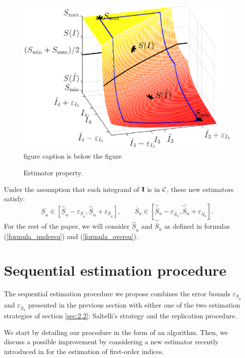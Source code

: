 \begin{figure}
\centering
\includegraphics[width=1\textwidth]{Images/estimator_3d_small.eps}
 figure caption is below the figure
\caption{Estimator property.}
\label{fig:1}       %
\end{figure} 

Under the assumption that each integrand of $\boldsymbol{\mathbf{I}}$ is in $\mathcal{C}$, these new estimators satisfy: \[ \underline{S}_u\in \left[ \widehat{\underline{S}}_u - \varepsilon_{\underline{S}_u}, \widehat{\underline{S}}_u + \varepsilon_{\underline{S}_u} \right], \qquad \overline{S}_u\in \left[ \widehat{\overline{S}}_u - \varepsilon_{\overline{S}_u}, \widehat{\overline{S}}_u + \varepsilon_{\overline{S}_u} \right] .\]
For the rest of the paper, we will consider $\widehat{\underline{S}}_u$ and $\widehat{\overline{S}}_u$   as defined in formulas (\ref{formula_undersu}) and (\ref{formula_oversu}).

\section{Sequential estimation procedure}
\label{sec:4}
The sequential estimation procedure we propose combines the error bounds $\varepsilon_{\underline{S}_u}$ and $\varepsilon_{\overline{S}_u}$ presented in the previous section with either one of the two estimation strategies of section \ref{sec:2.2}: Saltelli's strategy and the replication procedure. 

We start by detailing our procedure in the form of an algorithm. Then, we discuss a possible improvement by considering a new estimator recently introduced in \cite{Owen} for the estimation of first-order indices.

